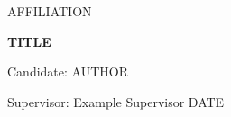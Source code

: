 \begin{titlepage}\centering
{\Large {{AFFILIATION}}\par}\vspace{2cm}
{\Huge\bfseries {{TITLE}}\par}\vspace{1cm}
Candidate: {{AUTHOR}}\par
Supervisor: Example Supervisor\vfill
{{DATE}}\end{titlepage}
